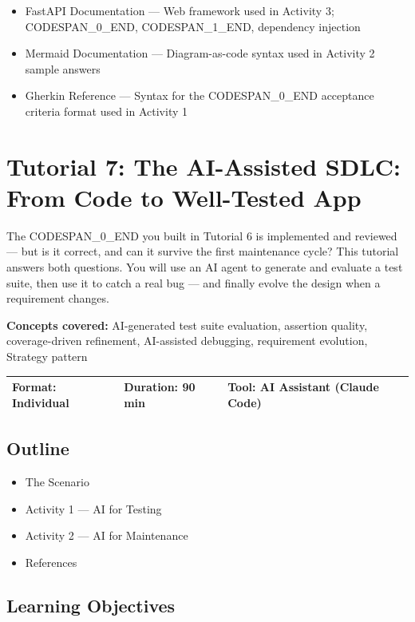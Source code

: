 \documentclass[11pt,a4paper]{book}
\begin{document}
\begin{itemize}
  \item FastAPI Documentation --- Web framework used in Activity 3; CODESPAN\_0\_END, CODESPAN\_1\_END, dependency injection
  \item Mermaid Documentation --- Diagram-as-code syntax used in Activity 2 sample answers
  \item Gherkin Reference --- Syntax for the CODESPAN\_0\_END acceptance criteria format used in Activity 1
\end{itemize}


\chapter{Tutorial 7: The AI-Assisted SDLC: From Code to Well-Tested App}

The CODESPAN\_0\_END you built in Tutorial 6 is implemented and reviewed --- but is it correct, and can it survive the first maintenance cycle? This tutorial answers both questions. You will use an AI agent to generate and evaluate a test suite, then use it to catch a real bug --- and finally evolve the design when a requirement changes.

\textbf{Concepts covered:} AI-generated test suite evaluation, assertion quality, coverage-driven refinement, AI-assisted debugging, requirement evolution, Strategy pattern

\begin{tabular}{lll}
\hline
\textbf{Format:} Individual & \textbf{Duration:} 90 min & \textbf{Tool:} AI Assistant (Claude Code) \\
\hline
\end{tabular}

\medskip

\section{Outline}

\begin{itemize}
  \item The Scenario
  \item Activity 1 --- AI for Testing
  \item Activity 2 --- AI for Maintenance
  \item References
\end{itemize}

\medskip

\section{Learning Objectives}
\end{document}

